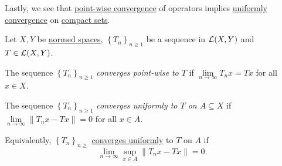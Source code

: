 Lastly, we see that \hyperref[def:point-wise-convergence]{point-wise convergence} of operators implies \hyperref[def:uniformly-convergence]{uniformly convergence} on \hyperref[def:compact]{compact sets}.

\begin{definition*}
	Let \(X, Y\) be \hyperref[def:normed-vector-space]{normed spaces}, \(\left\{ T_n \right\}_{n\geq 1}\) be a sequence in \(\mathcal{\MakeUppercase{l}} (X, Y)\) and \(T\in \mathcal{\MakeUppercase{l}} (X, Y)\).
	\begin{definition}\label{def:point-wise-convergence}
		The sequence \(\left\{ T_n \right\} _{n \geq 1}\) \emph{converges point-wise to \(T\)} if \(\lim\limits_{n \to \infty} T_n x = Tx\) for all \(x\in X\).
	\end{definition}

	\begin{definition}\label{def:uniformly-convergence}
		The sequence \(\left\{ T_n \right\} _{n \geq 1}\) \emph{converges uniformly to \(T\) on \(A\subseteq X\)} if \(\lim\limits_{n \to \infty} \left\lVert T_n x - Tx\right\rVert = 0\)  for all \(x\in A\).
	\end{definition}
\end{definition*}

Equivalently, \(\left\{ T_n \right\} _{n\geq }\) \hyperref[def:uniformly-convergence]{converges uniformly} to \(T\) on \(A\) if
\[
	\lim_{n \to \infty} \sup_{x\in A} \left\lVert T_n x - Tx\right\rVert = 0.
\]

